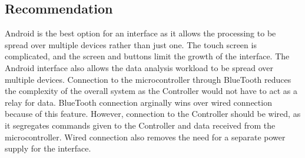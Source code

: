 \documentclass[draftclsnofoot,onecolumn,letterpaper,10pt]{IEEEtran}
\begin{document}
\subsection{Recommendation}
Android is the best option for an interface as it allows the processing to be spread over multiple devices rather than just one.
The touch screen is complicated, and the screen and buttons limit the growth of the interface.
The Android interface also allows the data analysis workload to be spread over multiple devices.
Connection to the microcontroller through BlueTooth reduces the complexity of the overall system as the Controller would not have to act as a relay for data.
BlueTooth connection arginally wins over wired connection because of this feature.
However, connection to the Controller should be wired, as it segregates commands given to the Controller and data received from the microcontroller.
Wired connection also removes the need for a separate power supply for the interface.
\newpage



\end{document}
